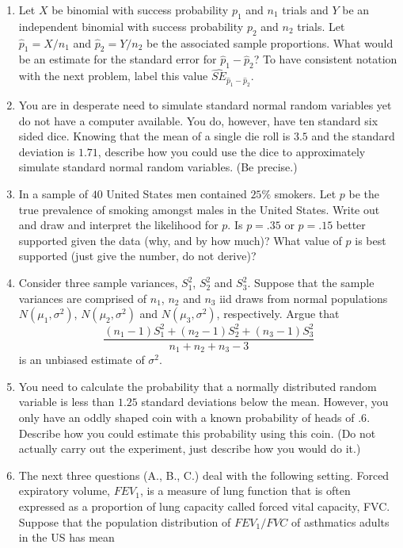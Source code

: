 \documentclass[12pt]{article}
\begin{document}
\begin{enumerate}[Problem 1.]
  \item Let $X$ be binomial with success probability $p_1$ and $n_1$
    trials and $Y$ be an independent binomial with success probability
    $p_2$ and $n_2$ trials.  Let $\hat p_1 = X / n_1$ and $\hat p_2 =
    Y / n_2$ be the associated sample proportions. What would be an
    estimate for the standard error for $\hat p_1 - \hat p_2$? To have
    consistent notation with the next problem, label
    this value $\hat{SE}_{\hat p_1 - \hat p_2}$.

\item You are in desperate need to simulate standard normal random
  variables yet do not have a computer available. You do, however, have
  ten standard six sided dice. Knowing that the mean of a single die roll
  is $3.5$ and the standard deviation is $1.71$, describe how you
  could use the dice to approximately simulate standard normal random variables. (Be precise.)
\item In a sample of $40$ United States men contained $25\%$
  smokers. Let $p$ be the true prevalence of smoking amongst males in
  the United States. Write out and draw and interpret the likelihood
  for $p$. Is $p=.35$ or $p=.15$ better supported given the data (why,
  and by how much)? What value of $p$ is best supported (just give the
  number, do not derive)?
\item Consider three sample variances, $S_1^2$, $S_2^2$ and
  $S_3^2$. Suppose that the sample variances are comprised of $n_1$,
  $n_2$ and $n_3$ iid draws from normal populations $N(\mu_1,
  \sigma^2)$, $N(\mu_2, \sigma^2)$ and $N(\mu_3, \sigma^2)$, respectively. Argue
  that $$\frac{(n_1 - 1)S_1^2 + (n_2 - 1)S_2^2 + (n_3 - 1) S_3^2}{n_1
    + n_2 + n_3 - 3}$$ is an unbiased estimate of $\sigma^2$.
\item You need to calculate the probability that a normally
  distributed random variable is less than $1.25$ standard deviations
  below the mean. However, you only have an oddly shaped coin with a
  known probability of heads of $.6$. Describe how you could estimate
  this probability using this coin. (Do not actually carry out the
  experiment, just describe how you would do it.)
\item The next three questions (A., B., C.) deal with the following
  setting. Forced expiratory volume, $FEV_1$, is a measure of lung
  function that is often expressed as a proportion of lung capacity
  called forced vital capacity, FVC.  Suppose that the population
  distribution of $FEV_1/FVC$ of asthmatics adults in the US has mean

\end{enumerate}
\end{document}

